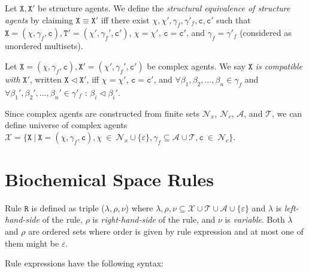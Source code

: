 \documentclass{entcs}
\renewcommand{\~}[0]{\texttildelow}
\begin{document}
\begin{defn}
Let $\mathtt{X},\mathtt{X}'$ be structure agents. We define the \emph{structural equivalence of structure agents} by claiming $\mathtt{X} \equiv \mathtt{X}'$ iff there exist $\chi,\chi',\gamma_f,\gamma'_f, \mathtt{c},\mathtt{c}'$ such that $\mathtt{X}=(\chi, \gamma_f, \mathtt{c}),\mathtt{T}'=(\chi', \gamma_f', \mathtt{c}')$, $\chi=\chi'$, $\mathtt{c} = \mathtt{c}'$, and $\gamma_f=\gamma'_f$ (considered as unordered multisets).
\end{defn}

\begin{defn}
Let $\mathtt{X} = (\chi, \gamma_f, \mathtt{c}), \mathtt{X}' = (\chi', \gamma_f', \mathtt{c}')$ be complex agents. We say $\mathtt{X}$ \emph{is compatible with} $\mathtt{X}'$, written $\mathtt{X} \lhd \mathtt{X}'$, iff $\chi=\chi'$, $\mathtt{c} = \mathtt{c}'$, and $\forall \beta_1, \beta_2, ..., \beta_n \in \gamma_f $ and $\forall \beta_1', \beta_2', ..., \beta_n' \in \gamma'_f$ : $\beta_i \lhd \beta_i'$. 
\end{defn}

\begin{theorem}
Since complex agents are constructed from finite sets $\mathcal{N}_{x},~\mathcal{N}_{c}$, $\mathcal{A}$, and $\mathcal{T}$, we can define universe of complex agents $\mathcal{X} = \{ \mathtt{X}~|~\mathtt{X} = (\chi, \gamma_f, \mathtt{c}), \chi~\in~\mathcal{N}_{x} \cup \{\varepsilon\}, \gamma_f \subseteq \mathcal{A} \cup \mathcal{T},  \mathtt{c}~\in~\mathcal{N}_{c} \}$.
\end{theorem}

\section{Biochemical Space Rules}

\begin{definition}
Rule $\mathtt{R}$ is defined as triple ($\lambda, \rho, \nu$) where $\lambda, \rho, \nu \subseteq \mathcal{X} \cup \mathcal{T} \cup \mathcal{A} \cup \{\varepsilon\}$ and $\lambda$ is \emph{left-hand-side} of the rule, $\rho$ is \emph{right-hand-side} of the rule, and $\nu$ is \emph{variable}. Both $\lambda$ and $\rho$ are ordered sets where order is given by rule expression and at most one of them might be $\varepsilon$.
\end{definition}

Rule expressions have the following syntax:
\end{document}
